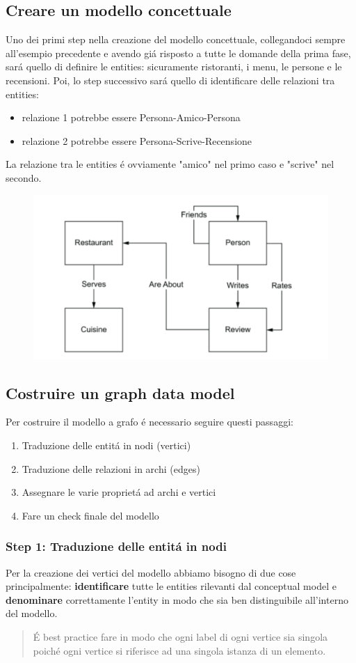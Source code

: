 \subsection{Creare un modello concettuale}
Uno dei primi step nella creazione del modello concettuale, collegandoci sempre all'esempio precedente e avendo giá risposto a tutte le domande della prima fase, sará quello di definire le entities: sicuramente ristoranti, i menu, le persone e le recensioni. Poi, lo step successivo sará quello di identificare delle relazioni tra entities: 
\begin{itemize}
    \item relazione 1 potrebbe essere Persona-Amico-Persona
    \item relazione 2 potrebbe essere Persona-Scrive-Recensione 
\end{itemize}
La relazione tra le entities é ovviamente "amico" nel primo caso e "scrive" nel secondo. 
\\
\begin{figure}[th]
    \centering
    \includegraphics[width=0.5\linewidth]{GraphModeling//img/esempio.png}
\end{figure}

\subsection{Costruire un graph data model}
Per costruire il modello a grafo é necessario seguire questi passaggi: 
\begin{enumerate}
    \item Traduzione delle entitá in nodi (vertici)
    \item Traduzione delle relazioni in archi (edges)
    \item Assegnare le varie proprietá ad archi e vertici
    \item Fare un check finale del modello
\end{enumerate}

\subsubsection*{Step 1: Traduzione delle entitá in nodi}
Per la creazione dei vertici del modello abbiamo bisogno di due cose principalmente: \textbf{identificare} tutte le entities rilevanti dal conceptual model e \textbf{denominare} correttamente l'entity in modo che sia ben distinguibile all'interno del modello. 
\begin{quote}
    É best practice fare in modo che ogni label di ogni vertice sia singola poiché ogni vertice si riferisce ad una singola istanza di un elemento. 
\end{quote}

